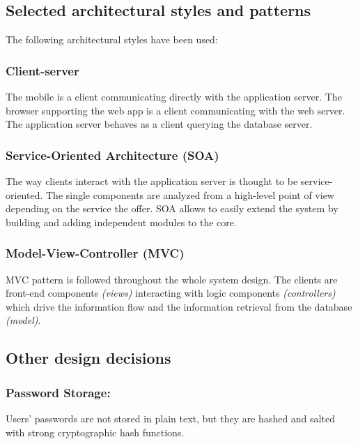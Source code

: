 \subsection{Selected architectural styles and patterns}

	The following architectural styles have been used:
	\subsubsection{Client-server}
	The mobile is a client
	communicating directly with the application server. The browser supporting the web
	app is a client communicating with the web server. The application server
	behaves as a client querying the database server.
	
	\subsubsection{Service-Oriented Architecture (SOA)}

	The way clients interact
	with the application server is thought to be service-oriented. The single components are analyzed from a high-level point of view depending on the service
	the offer. SOA allows to easily extend the system by building and adding independent modules to the core.
	
	\subsubsection{Model-View-Controller (MVC)}

	MVC pattern is followed throughout
	the whole system design. The clients are front-end components \textit{(views)} interacting with logic components \textit{(controllers)} which drive the information flow and
	the information retrieval from the database \textit{(model)}.
	
\subsection{Other design decisions}
	\subsubsection{Password Storage:}
	Users' passwords are not stored in plain text, but they are hashed and salted
	with strong cryptographic hash functions.